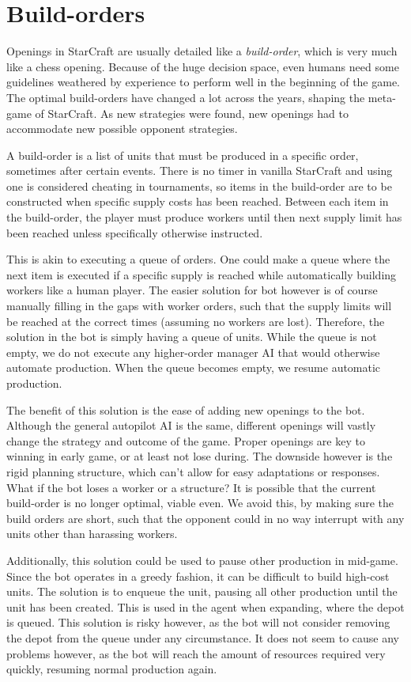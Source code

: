 \section{Build-orders}
Openings in StarCraft are usually detailed like a \emph{build-order}, which is very much like a chess opening. Because of the huge decision space, even humans need some guidelines weathered by experience to perform well in the beginning of the game. The optimal build-orders have changed a lot across the years, shaping the meta-game of StarCraft. As new strategies were found, new openings had to accommodate new possible opponent strategies.

A build-order is a list of units that must be produced in a specific order, sometimes after certain events. There is no timer in vanilla StarCraft and using one is considered cheating in tournaments, so items in the build-order are to be constructed when specific supply costs has been reached. Between each item in the build-order, the player must produce workers until then next supply limit has been reached unless specifically otherwise instructed. 

This is akin to executing a queue of orders. One could make a queue where the next item is executed if a specific supply is reached while automatically building workers like a human player. The easier solution for bot however is of course manually filling in the gaps with worker orders, such that the supply limits will be reached at the correct times (assuming no workers are lost). Therefore, the solution in the bot is simply having a queue of units. While the queue is not empty, we do not execute any higher-order manager AI that would otherwise automate production. When the queue becomes empty, we resume automatic production.

The benefit of this solution is the ease of adding new openings to the bot. Although the general autopilot AI is the same, different openings will vastly change the strategy and outcome of the game. Proper openings are key to winning in early game, or at least not lose during. The downside however is the rigid planning structure, which can't allow for easy adaptations or responses. What if the bot loses a worker or a structure? It is possible that the current build-order is no longer optimal, viable even. We avoid this, by making sure the build orders are short, such that the opponent could in no way interrupt with any units other than harassing workers.

Additionally, this solution could be used to pause other production in mid-game. Since the bot operates in a greedy fashion, it can be difficult to build high-cost units. The solution is to enqueue the unit, pausing all other production until the unit has been created. This is used in the agent when expanding, where the depot is queued. This solution is risky however, as the bot will not consider removing the depot from the queue under any circumstance. It does not seem to cause any problems however, as the bot will reach the amount of resources required very quickly, resuming normal production again.

